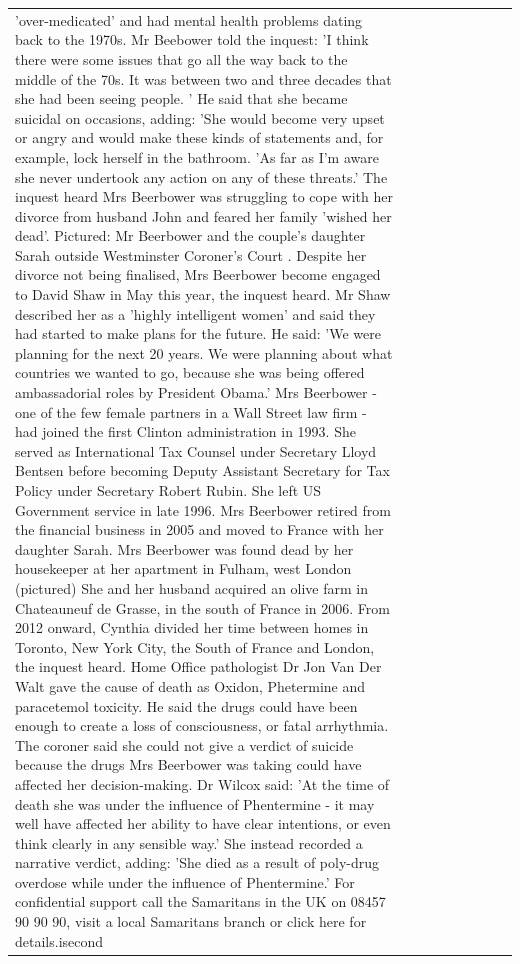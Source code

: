 \begin{table}[H]
\begin{tabular}{lllrlllll}
'over-medicated' and had mental health problems dating back to the 1970s. Mr Beebower told the inquest: 'I think there were some issues that go all the way back to the middle of the 70s. It was between two and three decades that she had been seeing people. ' He said that she became suicidal on occasions, adding: 'She would become very upset or angry and would make these kinds of statements and, for example, lock herself in the bathroom. 'As far as I'm aware she never undertook any action on any of these threats.' The inquest heard Mrs Beerbower was struggling to cope with her divorce from husband John and feared her family 'wished her dead'. Pictured: Mr Beerbower and the couple's daughter Sarah outside Westminster Coroner's Court . Despite her divorce not being finalised, Mrs Beerbower become engaged to David Shaw in May this year, the inquest heard. Mr Shaw described her as a 'highly intelligent women' and said they had started to make plans for the future. He said: 'We were planning for the next 20 years. We were planning about what countries we wanted to go, because she was being offered ambassadorial roles by President Obama.' Mrs Beerbower - one of the few female partners in a Wall Street law firm - had joined the first Clinton administration in 1993. She served as International Tax Counsel under Secretary Lloyd Bentsen before becoming Deputy Assistant Secretary for Tax Policy under Secretary Robert Rubin. She left US Government service in late 1996. Mrs Beerbower retired from the financial business in 2005 and moved to France with her daughter Sarah. Mrs Beerbower was found dead by her housekeeper at her apartment in Fulham, west London (pictured) She and her husband acquired an olive farm in Chateauneuf de Grasse, in the south of France in 2006. From 2012 onward, Cynthia divided her time between homes in Toronto, New York City, the South of France and London, the inquest heard. Home Office pathologist Dr Jon Van Der Walt gave the cause of death as Oxidon, Phetermine and paracetemol toxicity. He said the drugs could have been enough to create a loss of consciousness, or fatal arrhythmia. The coroner said she could not give a verdict of suicide because the drugs Mrs Beerbower was taking could have affected her decision-making. Dr Wilcox said: 'At the time of death she was under the influence of Phentermine - it may well have affected her ability to have clear intentions, or even think clearly in any sensible way.' She instead recorded a narrative verdict, adding: 'She died as a result of poly-drug overdose while under the influence of Phentermine.' For confidential support call the Samaritans in the UK on 08457 90 90 90, visit a local Samaritans branch or click here for details.isecond \\

\end{tabular}
\end{table}
